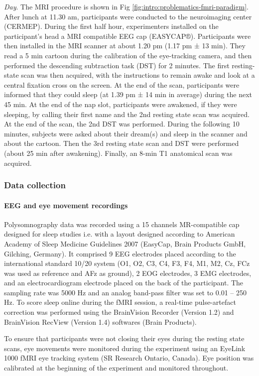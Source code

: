 \emph{Day}. The MRI procedure is shown in Fig \ref{fig:intro:problematics-fmri-paradigm}. After lunch at 11.30 am, participants were conducted to the neuroimaging center (CERMEP). During the first half hour, experimenters installed on the participant’s head a MRI compatible EEG cap (EASYCAP®). Participants were then installed in the MRI scanner at about 1.20 pm (1.17 pm ± 13 min). They read a 5 min cartoon during the calibration of the eye-tracking camera, and then performed the descending subtraction task (DST) for 2 minutes. The first resting-state scan was then acquired, with the instructions to remain awake and look at a central fixation cross on the screen. At the end of the scan, participants were informed that they could sleep (at 1.39 pm ± 14 min in average) during the next 45 min. At the end of the nap slot, participants were awakened, if they were sleeping, by calling their first name and the 2nd resting state scan was acquired. At the end of the scan, the 2nd DST was performed. During the following 10 minutes, subjects were asked about their dream(s) and sleep in the scanner and about the cartoon. Then the 3rd resting state scan and DST were performed (about 25 min after awakening). Finally, an 8-min T1 anatomical scan was acquired.

\subsubsection*{Data collection}
\paragraph{EEG and eye movement recordings}
Polysomnography data was recorded using a 15 channels MR-compatible cap designed for sleep studies i.e. with a layout designed according to American Academy of Sleep Medicine Guidelines 2007 (EasyCap, Brain Products GmbH, Gilching, Germany). It comprised 9 EEG electrodes placed according to the international standard 10/20 system (O1, O2, C3, C4, F3, F4, M1, M2, Cz, FCz was used as reference and AFz as ground), 2 EOG electrodes, 3 EMG electrodes, and an electrocardiogram electrode placed on the back of the participant. The sampling rate was 5000 Hz and an analog band-pass filter was set to 0.01 – 250 Hz.  To score sleep online during the fMRI session, a real-time pulse-artefact correction was performed using the BrainVision Recorder (Version 1.2) and BrainVision RecView (Version 1.4) softwares (Brain Products).

To ensure that participants were not closing their eyes during the resting state scans, eye movements were monitored during the experiment using an EyeLink 1000 fMRI eye tracking system (SR Research Ontario, Canada). Eye position was calibrated at the beginning of the experiment and monitored throughout.

